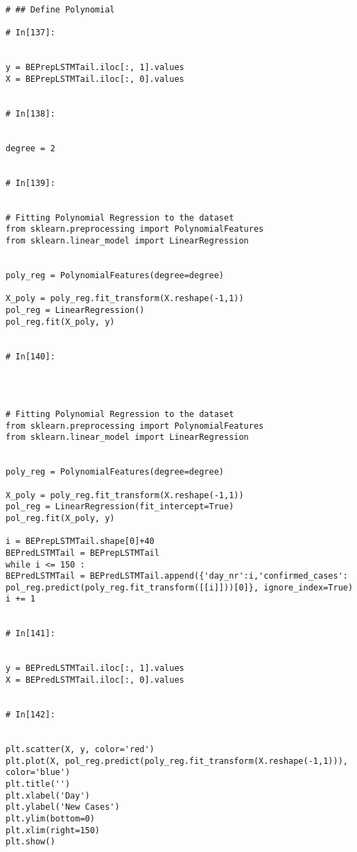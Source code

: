 \begin{lstlisting}
# ## Define Polynomial

# In[137]:


y = BEPrepLSTMTail.iloc[:, 1].values
X = BEPrepLSTMTail.iloc[:, 0].values


# In[138]:


degree = 2


# In[139]:


# Fitting Polynomial Regression to the dataset
from sklearn.preprocessing import PolynomialFeatures
from sklearn.linear_model import LinearRegression


poly_reg = PolynomialFeatures(degree=degree)

X_poly = poly_reg.fit_transform(X.reshape(-1,1))
pol_reg = LinearRegression()
pol_reg.fit(X_poly, y)


# In[140]:




# Fitting Polynomial Regression to the dataset
from sklearn.preprocessing import PolynomialFeatures
from sklearn.linear_model import LinearRegression


poly_reg = PolynomialFeatures(degree=degree)

X_poly = poly_reg.fit_transform(X.reshape(-1,1))
pol_reg = LinearRegression(fit_intercept=True)
pol_reg.fit(X_poly, y)

i = BEPrepLSTMTail.shape[0]+40
BEPredLSTMTail = BEPrepLSTMTail
while i <= 150 :
BEPredLSTMTail = BEPredLSTMTail.append({'day_nr':i,'confirmed_cases': pol_reg.predict(poly_reg.fit_transform([[i]]))[0]}, ignore_index=True)
i += 1


# In[141]:


y = BEPredLSTMTail.iloc[:, 1].values
X = BEPredLSTMTail.iloc[:, 0].values


# In[142]:


plt.scatter(X, y, color='red')
plt.plot(X, pol_reg.predict(poly_reg.fit_transform(X.reshape(-1,1))), color='blue')
plt.title('')
plt.xlabel('Day')
plt.ylabel('New Cases')
plt.ylim(bottom=0)
plt.xlim(right=150)
plt.show()

\end{lstlisting}

